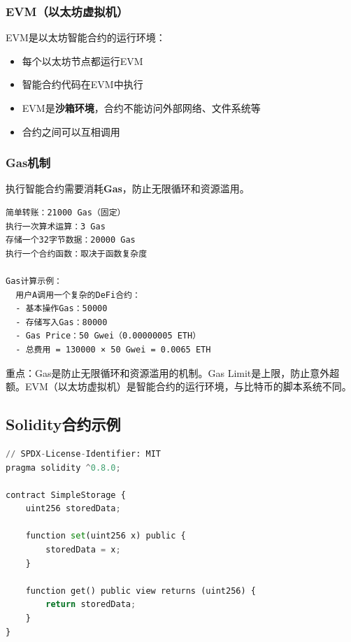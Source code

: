 ﻿\documentclass[12pt,a4paper]{article}
\begin{document}
\subsubsection{EVM（以太坊虚拟机）}

EVM是以太坊智能合约的运行环境：
\begin{itemize}[leftmargin=1.5em]
\item 每个以太坊节点都运行EVM
\item 智能合约代码在EVM中执行
\item EVM是\textbf{沙箱环境}，合约不能访问外部网络、文件系统等
\item 合约之间可以互相调用
\end{itemize}

\subsubsection{Gas机制}

执行智能合约需要消耗\textbf{Gas}，防止无限循环和资源滥用。

\begin{lstlisting}
简单转账：21000 Gas（固定）
执行一次算术运算：3 Gas
存储一个32字节数据：20000 Gas
执行一个合约函数：取决于函数复杂度

Gas计算示例：
  用户A调用一个复杂的DeFi合约：
  - 基本操作Gas：50000
  - 存储写入Gas：80000
  - Gas Price：50 Gwei（0.00000005 ETH）
  - 总费用 = 130000 × 50 Gwei = 0.0065 ETH
\end{lstlisting}

\begin{keypointbox}
重点：Gas是防止无限循环和资源滥用的机制。Gas Limit是上限，防止意外超额。EVM（以太坊虚拟机）是智能合约的运行环境，与比特币的脚本系统不同。
\end{keypointbox}

\subsection{Solidity合约示例}

\begin{lstlisting}[language=Python]
// SPDX-License-Identifier: MIT
pragma solidity ^0.8.0;

contract SimpleStorage {
    uint256 storedData;
    
    function set(uint256 x) public {
        storedData = x;
    }
    
    function get() public view returns (uint256) {
        return storedData;
    }
}
\end{lstlisting}
\end{document}
